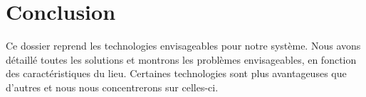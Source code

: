 
\section{Conclusion}

Ce dossier reprend les technologies envisageables pour notre système. Nous avons détaillé toutes les solutions et montrons les problèmes envisageables, en fonction des caractéristiques du lieu. Certaines technologies sont plus avantageuses que d'autres et nous nous concentrerons sur celles-ci.


